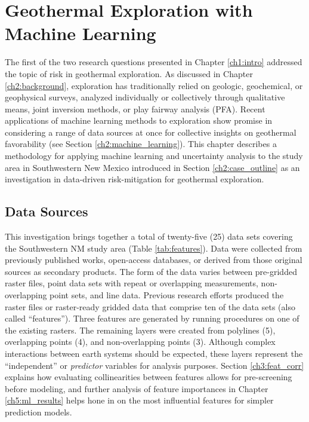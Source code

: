 \chapter{Geothermal Exploration with Machine Learning}\label{ch3:expl_ml_prep}

The first of the two research questions presented in Chapter \ref{ch1:intro} addressed the topic of risk in geothermal exploration. As discussed in Chapter \ref{ch2:background}, exploration has traditionally relied on geologic, geochemical, or geophysical surveys, analyzed individually or collectively through qualitative means, joint inversion methods, or play fairway analysis (PFA). Recent applications of machine learning methods to exploration show promise in considering a range of data sources at once for collective insights on geothermal favorability (see Section \ref{ch2:machine_learning}). This chapter describes a methodology for applying machine learning and uncertainty analysis to the study area in Southwestern New Mexico introduced in Section \ref{ch2:case_outline} as an investigation in data-driven risk-mitigation for geothermal exploration.

\section{Data Sources}\label{ch3:expl_data_src}
This investigation brings together a total of twenty-five (25) data sets covering the Southwestern NM study area (Table \ref{tab:features}). Data were collected from previously published works, open-access databases, or derived from those original sources as secondary products. The form of the data varies between pre-gridded raster files, point data sets with repeat or overlapping measurements, non-overlapping point sets, and line data. Previous research efforts produced the raster files or raster-ready gridded data that comprise ten of the data sets (also called ``features”). Three features are generated by running procedures on one of the existing rasters. The remaining layers were created from polylines (5), overlapping points (4), and non-overlapping points (3). Although complex interactions between earth systems should be expected, these layers represent the ``independent'' or \textit{predictor} variables for analysis purposes. Section \ref{ch3:feat_corr} explains how evaluating collinearities between features allows for pre-screening before modeling, and further analysis of feature importances in Chapter \ref{ch5:ml_results} helps hone in on the most influential features for simpler prediction models.

